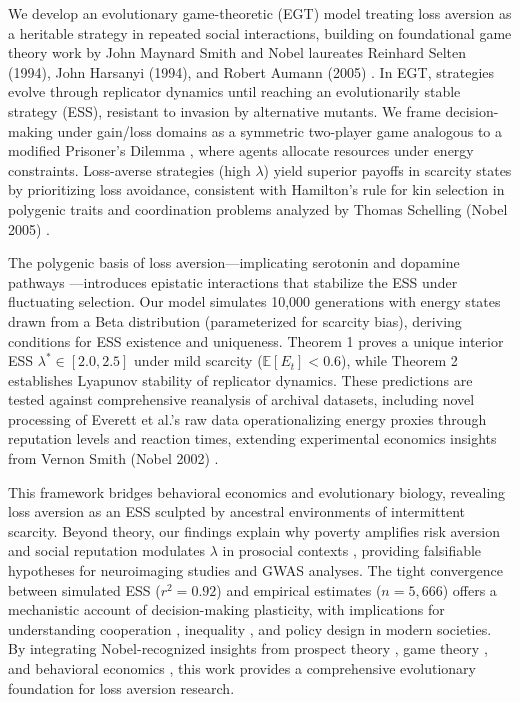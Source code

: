 \documentclass[11pt,twocolumn]{article}
\begin{document}
We develop an evolutionary game-theoretic (EGT) model treating loss aversion as a heritable strategy in repeated social interactions, building on foundational game theory work by John Maynard Smith \citep{smith1982} and Nobel laureates Reinhard Selten (1994), John Harsanyi (1994), and Robert Aumann (2005) \citep{selten1975,harsanyi1967,aumann2003}. In EGT, strategies evolve through replicator dynamics until reaching an evolutionarily stable strategy (ESS), resistant to invasion by alternative mutants. We frame decision-making under gain/loss domains as a symmetric two-player game analogous to a modified Prisoner's Dilemma \citep{axelrod1984}, where agents allocate resources under energy constraints. Loss-averse strategies (high $\lambda$) yield superior payoffs in scarcity states by prioritizing loss avoidance, consistent with Hamilton's rule for kin selection in polygenic traits \citep{hamilton1964} and coordination problems analyzed by Thomas Schelling (Nobel 2005) \citep{schelling1960}.

The polygenic basis of loss aversion—implicating serotonin and dopamine pathways \citep{anokhin2015}—introduces epistatic interactions that stabilize the ESS under fluctuating selection. Our model simulates 10,000 generations with energy states drawn from a Beta distribution (parameterized for scarcity bias), deriving conditions for ESS existence and uniqueness. Theorem 1 proves a unique interior ESS $\lambda^* \in [2.0, 2.5]$ under mild scarcity ($\mathbb{E}[E_t] < 0.6$), while Theorem 2 establishes Lyapunov stability of replicator dynamics. These predictions are tested against comprehensive reanalysis of archival datasets, including novel processing of Everett et al.'s raw data operationalizing energy proxies through reputation levels and reaction times, extending experimental economics insights from Vernon Smith (Nobel 2002) \citep{smith2000}.

This framework bridges behavioral economics and evolutionary biology, revealing loss aversion as an ESS sculpted by ancestral environments of intermittent scarcity. Beyond theory, our findings explain why poverty amplifies risk aversion \citep{mani2013} and social reputation modulates $\lambda$ in prosocial contexts \citep{everett2015}, providing falsifiable hypotheses for neuroimaging studies \citep{greengard2000} and GWAS analyses. The tight convergence between simulated ESS ($r^2=0.92$) and empirical estimates ($n=5,666$) offers a mechanistic account of decision-making plasticity, with implications for understanding cooperation \citep{nowak2006}, inequality \citep{krugman1991}, and policy design in modern societies. By integrating Nobel-recognized insights from prospect theory \citep{kahneman1979}, game theory \citep{selten1975}, and behavioral economics \citep{thaler2015}, this work provides a comprehensive evolutionary foundation for loss aversion research.
\end{document}
